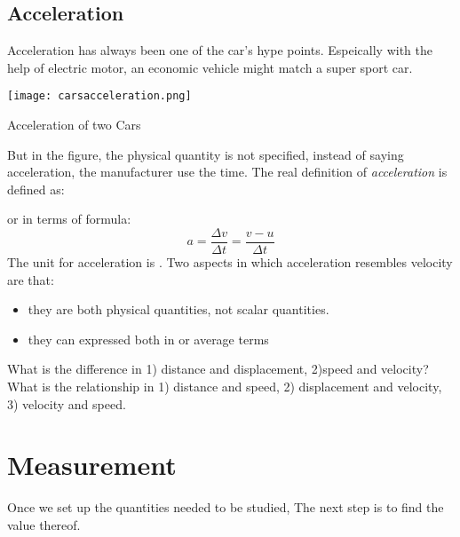 \documentclass[a4paper]{tufte-handout}
\newenvironment{SummBox}
{\begin{tcolorbox}[breakable,colback=r1!30,colframe=r1,title=Summary]} {\end{tcolorbox}}
\begin{document}
\subsection{Acceleration}
Acceleration has always been one of the car's hype points. Espeically with the help of electric motor, an economic vehicle might match a super sport car. 
\begin{marginfigure}
\texttt{[image: carsacceleration.png]}
\caption{Acceleration of two Cars}
\end{marginfigure}
But in the figure, the physical quantity is not specified, instead of saying acceleration, the manufacturer use the time. The real definition of \emph{acceleration} is defined as:
\begin{center}
\uline{\hfill}
\end{center}
or in terms of formula:
\begin{equation}
  a = \frac{\Delta v}{\Delta t} = \frac{v-u}{\Delta t}
\end{equation}
The unit for acceleration is \uline{\hspace{0.4 in}}. Two aspects in which acceleration resembles velocity are that:
\begin{itemize}
   \item they are both \uline{\hspace{0.4 in}} physical quantities, not scalar quantities.
   \item they can expressed both in \uline{\hspace{0.4 in}} or average terms
\end{itemize}

\begin{SummBox}
What is the difference in 1) distance and displacement, 2)speed and velocity?
\tcblower
What is the relationship in 1) distance and speed, 2) displacement and velocity, 3) velocity and speed.
\end{SummBox}


\section{Measurement}
Once we set up the quantities needed to be studied, The next step is to find the value thereof.
\end{document}
